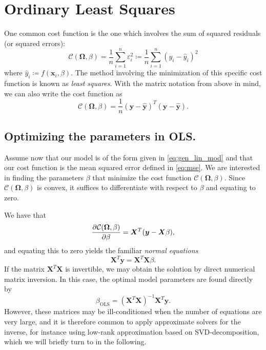 \documentclass[dvipsnames, article, a4paper, oneside, 12pt]{memoir}
\newcommand{\x}{\bm{x}}
\newcommand{\X}{\bm{X}}
\newcommand{\OLS}{\mathrm{OLS}}
\newcommand{\y}{\bm{y}}
\newcommand{\data}{\bm{\Omega}}
\newcommand{\cost}{\mathcal{C}}
\begin{document}
  \section{Ordinary Least Squares}
  
  One common cost function is the one which involves the sum of squared
  residuals (or squared errors):
  \begin{equation}
    \label{eq:mse}
    \cost(\data, \beta) = \frac{1}{n}\sum_{i = 1}^n \varepsilon_i^2 \coloneqq \frac{1}{n}\sum_{i=1}^n (y_i - \hat{y}_i)^2
  \end{equation}
  where \( \hat{y}_i \coloneqq f(\x_i, \beta) \). The method involving the
  minimization of this specific cost function is known as \emph{least squares}.
  With the matrix notation from above in mind, we can also write the cost
  function as
  \begin{equation}
    \cost(\data, \beta) = \frac{1}{n} (\y - \hat{\y})^T (\y - \hat{\y}).
  \end{equation}

  

  \subsection{Optimizing the parameters in OLS.}
  
  Assume now that our model is of the form given in \cref{eq:gen_lin_mod} and
  that our cost function is the mean squared error defined in \cref{eq:mse}. We
  are interested in finding the parameters \( \beta \) that minimize the cost
  function \( \cost(\data, \beta) \). Since \( \cost(\data, \beta) \) is
  convex, it suffices to differentiate with respect to \( \beta \) and equating
  to zero. 
  
  We have that
  \begin{align}
    \dpd{\cost(\data, \beta)}{\beta} = \X^T(\y - \X\beta), 
  \end{align}
  and equating this to zero yields the familiar \emph{normal equations}
  \begin{equation}
    \X^T \y = \X^T\X\beta.
  \end{equation}
  If the matrix \( \X^T\X \) is invertible, we may obtain the solution by
  direct numerical matrix inversion. In this case, the optimal model parameters
  are found directly by
  \begin{equation}
    \label{eq:optimal}
    \beta_{\OLS} = (\X^T\X)^{-1}\X^T\y.
  \end{equation}
  However, these matrices may be ill-conditioned when the number of equations
  are very large, and it is therefore common to apply approximate solvers for
  the inverse, for instance using low-rank approximation based on
  \textsc{SVD}-decomposition, which we will briefly turn to in the following.
\end{document}
